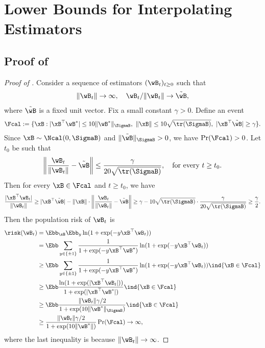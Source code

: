 \documentclass[11pt]{article}
\begin{document}
\section{Lower Bounds for Interpolating Estimators}
\subsection{Proof of \texorpdfstring{}{Theorem 4.1}}\label{sec:proof:logistic:lower-bound}
\begin{proof}[Proof of ]
Consider a sequence of estimators $(\wB_t)_{t\ge 0}$ such that
\begin{align*}
    \|\wB_t\|\to \infty,\quad 
    \wB_t / \|\wB_t\| \to \tilde\wB,
\end{align*}
where $\tilde\wB$ is a fixed unit vector.
Fix a small constant $\gamma>0$. Define an event 
\begin{align*}
    \Fcal := \{\xB: |\xB^\top \wB^*|\le 10 \|\wB^*\|_{\SigmaB},\  \|\xB\|\le 10\sqrt{\tr(\SigmaB)},\ |\xB^\top \tilde\wB|\ge \gamma \}.
\end{align*}
Since $\xB \sim \Ncal(0, \SigmaB)$ and $ \|\tilde\wB\|_{\SigmaB} > 0$, we have $\Pr(\Fcal)>0$.
Let $t_0$ be such that
\begin{align*}
    \bigg\|\frac{\wB_t}{ \|\wB_t\|} - \tilde\wB\bigg\| \le \frac{\gamma}{20\sqrt{\tr(\SigmaB)}},\quad \text{for every $t\ge t_0$}.
\end{align*}
Then for every $\xB\in\Fcal$ and $t\ge t_0$, we have
\begin{align*}
     \frac{|\xB^\top \wB_t |}{\|\wB_t\|} \ge |\xB^\top\tilde\wB| - \|\xB\|\cdot\bigg\| \frac{\wB_t}{ \|\wB_t\|} - \tilde\wB\bigg\| \ge \gamma -  10\sqrt{\tr(\SigmaB)} \cdot \frac{\gamma}{20\sqrt{\tr(\SigmaB)}} \ge  \frac{\gamma}{2}.
\end{align*}
Then the population risk of $\wB_t$ is
\begin{align*}
    \risk(\wB_t) 
    &= \Ebb_{\xB} \Ebb_{y} \ln(1+\exp(-y\xB^\top \wB_t)) \\
    &= \Ebb \sum_{y\in\{\pm 1\}} \frac{1}{1+\exp(-y \xB^\top \wB^*)} \ln(1+\exp(-y\xB^\top \wB_t)) \\
    &\ge \Ebb \sum_{y\in\{\pm 1\}} \frac{1}{1+\exp(-y \xB^\top \wB^*)} \ln(1+\exp(-y\xB^\top \wB_t))\ind{\xB \in \Fcal} \\
    &\ge \Ebb \frac{\ln(1+\exp(|\xB^\top \wB_t|))}{1+\exp(|\xB^\top \wB^*|)}  \ind{\xB \in \Fcal}\\
    &\ge \Ebb \frac{ \|\wB_t\|\gamma / 2 }{1+\exp(10\|\wB^*\|_{\SigmaB})} \ind{\xB \in \Fcal} \\
    &\ge \frac{\|\wB_t\|\gamma / 2}{1+\exp(10\|\wB^*\|)}\Pr(\Fcal)  \to \infty,
\end{align*}
where the last inequality is because $\|\wB_t\|\to \infty$.


\end{proof}
\end{document}

